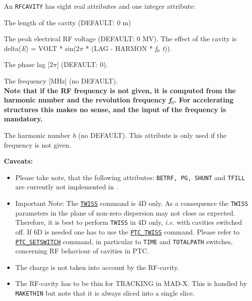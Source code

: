 An \texttt{RFCAVITY} has eight real attributes and one integer attribute:
\begin{madlist}
    The length of the cavity (DEFAULT: 0 m)

    The peak electrical RF voltage (DEFAULT: 0 MV). The effect of
   the cavity is \\
     delta(\textit{E}) = VOLT * sin(2$\pi$ * (LAG - HARMON * \textit{f$_0$ t})).

    The phase lag [$2\pi$] (DEFAULT: 0).

    The frequency [MHz] (no DEFAULT).  \\[3mm]
   \textbf{Note that if the RF frequency is not given, it is computed
     from the harmonic number and the revolution frequency
     \textit{f$_0$}. For accelerating structures this makes no sense,
     and the input of the frequency is mandatory.}

    The harmonic number \textit{h} (no DEFAULT). This
   attribute is only used if the frequency is not given.
\end{madlist}

\textbf{Caveats:}
\begin{itemize}
  \item Please take note, that the following \madeight attributes:
    \texttt{BETRF, PG, SHUNT} and \texttt{TFILL} are currently not implemented in
    \madx.

  \item Important Note: The \hyperref[chap:twiss]{\texttt{TWISS}} command
    is 4D only. As a consequence the \texttt{TWISS} parameters in the plane
    of non-zero dispersion may not close as expected. Therefore, it is best
    to perform \texttt{TWISS} in 4D only, \textsl{i.e.} with cavities
    switched off. If 6D is needed one has to use the
    \hyperref[sec:ptc-twiss]{\texttt{PTC\_TWISS}} command.
    Please refer to \hyperref[sec:ptc-setswitch]{\texttt{PTC\_SETSWITCH}} command,
    in particular to \texttt{TIME} and \texttt{TOTALPATH} switches,
    concerning RF behaviour of cavities in PTC.

  \item The charge is not taken into account by the RF-cavity.
  
  \item The RF-cavity has to be thin for TRACKING in MAD-X. This is handled by 
  \texttt{MAKETHIN} but note that it is always sliced into a single slice.  

\end{itemize}

